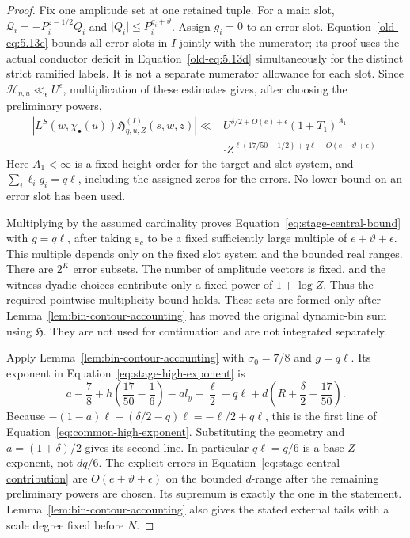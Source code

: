 \documentclass[11pt,a4paper]{article}
\numberwithin{equation}{section}
\numberwithin{figure}{section}
\theoremstyle{definition}
\theoremstyle{remark}
\begin{document}
\begin{proof}
Fix one amplitude set at one retained tuple.  For a main slot,
\(\mathcal Q_i=-P_i^{z-1/2}Q_i\) and
\(\lvert Q_i\rvert\le P_i^{g_i+\vartheta}\).  Assign \(g_i=0\) to
an error slot.  Equation~\eqref{old-eq:5.13e} bounds all error slots
in \(I\) jointly with the numerator; its proof uses the actual
conductor deficit in Equation~\eqref{old-eq:5.13d} simultaneously
for the distinct strict ramified labels.  It is not a separate
numerator allowance for each slot.  Since
\(\mathcal H_{\eta,u}\ll_\epsilon U^\epsilon\), multiplication of
these estimates gives, after choosing the preliminary powers,
\[
 \begin{split}
 \left|L^S(w,\chi_\bullet(u))
       \mathfrak H_{\eta,u,Z}^{(I)}(s,w,z)\right|
 \ll{}&U^{\delta/2+O(e)+\epsilon}(1+T_1)^{A_1}\\
 &\cdot
 Z^{\ell(17/50-1/2)+q\ell+O(e+\vartheta+\epsilon)}.
 \end{split}
\]
Here \(A_1<\infty\) is a fixed height order for the target and slot
system, and \(\sum_i\ell_i g_i=q\ell\), including the assigned zeros
for the errors.  No lower bound on an error slot has been used.

Multiplying by the assumed cardinality proves
Equation~\eqref{eq:stage-central-bound} with \(g=q\ell\), after taking
\(\varepsilon_c\) to be a fixed sufficiently large multiple of
\(e+\vartheta+\epsilon\).  This multiple depends only on the fixed slot
system and the bounded real ranges.  There are \(2^K\) error subsets.
The number of amplitude vectors is fixed, and the witness dyadic choices
contribute only a fixed power of \(1+\log Z\).  Thus the required
pointwise multiplicity bound holds.  These sets are formed only after
Lemma~\ref{lem:bin-contour-accounting} has moved the original dynamic-bin
sum using
\(\mathfrak H\).  They are not used for continuation and are not
integrated separately.

Apply Lemma~\ref{lem:bin-contour-accounting} with \(\sigma_0=7/8\)
and \(g=q\ell\).  Its exponent in
Equation~\eqref{eq:stage-high-exponent} is
\[
 a-\frac78+h\left(\frac{17}{50}-\frac16\right)-a l_y-\frac{\ell}{2}
       +q\ell+d\left(R+\frac\delta2-\frac{17}{50}\right).
\]
Because
\(-(1-a)\ell-(\delta/2-q)\ell=-\ell/2+q\ell\),
this is the first line of Equation~\eqref{eq:common-high-exponent}.
Substituting the geometry and \(a=(1+\delta)/2\) gives its second line.
In particular \(q\ell=q/6\) is a base-\(Z\) exponent, not \(dq/6\).
The explicit errors in Equation~\eqref{eq:stage-central-contribution}
are \(O(e+\vartheta+\epsilon)\) on the bounded \(d\)-range after the
remaining preliminary powers are chosen.  Its supremum is exactly the
one in the statement.  Lemma~\ref{lem:bin-contour-accounting} also gives
the stated external tails
with a scale degree fixed before \(N\).
\end{proof}
\end{document}
